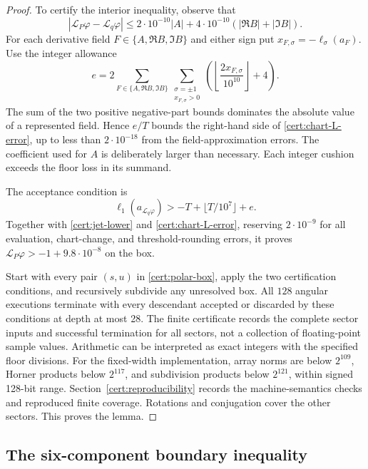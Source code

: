 \documentclass[11pt]{article}
\numberwithin{equation}{section}
\theoremstyle{definition}
\theoremstyle{remark}
\begin{document}
\begin{proof}
To certify the interior inequality, observe that
\begin{equation}\label{cert:chart-L-error}
 |\mathcal L_P\varphi-\mathcal L_q\varphi|
 \leq2\cdot10^{-10}|A|
              +4\cdot10^{-10}(|\Re B|+|\Im B|).
\end{equation}
For each derivative field $F\in\{A,\Re B,\Im B\}$ and either sign put
$x_{F,\sigma}=-\ell_\sigma(a_F)$.  Use the integer allowance
\[
 e=2\sum_{F\in\{A,\Re B,\Im B\}}
           \sum_{\substack{\sigma=\pm1\\x_{F,\sigma}>0}}
             \left(\left\lfloor\frac{2x_{F,\sigma}}{10^{10}}\right\rfloor+4\right).
\]
The sum of the two positive negative-part bounds dominates the absolute
value of a represented field.  Hence $e/T$ bounds the right-hand side of
\eqref{cert:chart-L-error}, up to less than $2\cdot10^{-18}$ from the
field-approximation errors.  The coefficient used for $A$ is deliberately
larger than necessary.  Each integer cushion exceeds the floor loss in its
summand.

The acceptance condition is
\begin{equation}\label{cert:accept-test}
 \ell_1(a_{\mathcal L_q\varphi})>-T+\lfloor T/10^7\rfloor+e.
\end{equation}
Together with \eqref{cert:jet-lower} and \eqref{cert:chart-L-error}, reserving
$2\cdot10^{-9}$ for all evaluation, chart-change, and threshold-rounding
errors, it proves
$\mathcal L_P\varphi>-1+9.8\cdot10^{-8}$ on the box.

Start with every pair $(s,u)$ in \eqref{cert:polar-box}, apply the two
certification conditions, and recursively subdivide any unresolved box.
All $128$ angular executions terminate with every descendant accepted or
discarded by these conditions at depth at most 28.  The finite certificate
records the complete sector inputs and successful termination for all
sectors, not a collection of floating-point sample values.  Arithmetic can
be interpreted as exact integers with the specified floor divisions.
For the fixed-width implementation, array norms are below $2^{109}$,
Horner products below $2^{117}$, and subdivision products below $2^{121}$,
within signed 128-bit range.  Section~\ref{cert:reproducibility} records the
machine-semantics checks and reproduced finite coverage.  Rotations and
conjugation cover the other sectors.  This proves the lemma.
\end{proof}

\subsection{The six-component boundary inequality}
\label{cert:boundary}
\end{document}
